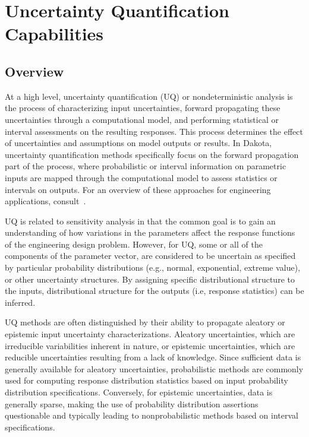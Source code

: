\chapter{Uncertainty Quantification Capabilities}\label{uq}

\section{Overview}\label{uq:overview}

At a high level, uncertainty quantification (UQ) or nondeterministic
analysis is the process of characterizing input uncertainties, forward
propagating these uncertainties through a computational model, and
performing statistical or interval assessments on the resulting
responses. This process determines the effect of uncertainties and
assumptions on model outputs or results. In Dakota, uncertainty
quantification methods specifically focus on the forward propagation
part of the process, where probabilistic or interval information on
parametric inputs are mapped through the computational model to assess
statistics or intervals on outputs. For an overview of these
approaches for engineering applications, consult~\cite{Hal00}.

UQ is related to sensitivity analysis in that the common goal is to
gain an understanding of how variations in the parameters affect the
response functions of the engineering design problem. However, for UQ,
some or all of the components of the parameter vector, are considered
to be uncertain as specified by particular probability distributions
(e.g., normal, exponential, extreme value), or other uncertainty
structures. By assigning specific distributional structure to the
inputs, distributional structure for the outputs (i.e, response
statistics) can be inferred.

UQ methods are often distinguished by their ability to propagate
aleatory or epistemic input uncertainty characterizations. Aleatory
uncertainties, which are irreducible variabilities inherent in nature,
or epistemic uncertainties, which are reducible uncertainties
resulting from a lack of knowledge. Since sufficient data is
generally available for aleatory uncertainties, probabilistic methods
are commonly used for computing response distribution statistics based
on input probability distribution specifications. Conversely, for
epistemic uncertainties, data is generally sparse, making the use of
probability distribution assertions questionable and typically leading
to nonprobabilistic methods based on interval specifications.

